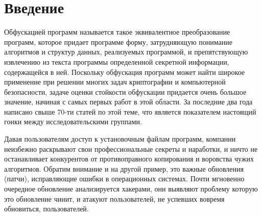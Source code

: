 \newpage
\section*{Введение}

Обфускацией программ называется такое эквивалентное преобразование программ, которое придает программе форму, затрудняющую понимание алгоритмов и структур данных, реализуемых программой, и препятствующую извлечению из текста программы определенной секретной информации, содержащейся в ней. Поскольку обфускация программ может найти широкое применение при решении многих задач криптографии и компьютерной безопасности, задаче оценки стойкости обфускации придается очень большое значение, начиная с самых первых работ в этой области. За последние два года написано свыше 70-ти статей по этой теме, что является показателем настоящий гонки между исследовательскими группами.

Давая пользователям доступ к установочным файлам программ, компании неизбежно раскрывают свои профессиональные секреты и наработки, и ничто не останавливает конкурентов от противоправного копирования и воровства чужих алгоритмов. Обратим внимание и на другой пример, это важные обновления (патчи), исправляющие ошибки в операционных системах. Почти мгновенно очередное обновление анализируется хакерами, они выявляют проблему которую это обновление чинит, и атакуют пользователей, не успевших вовремя обновиться, пользователей.